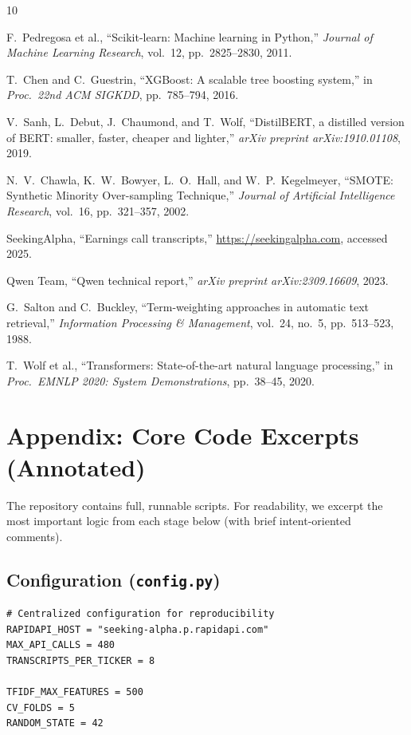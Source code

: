 \documentclass[12pt]{article}
\begin{document}
\begin{thebibliography}{10}

F.~Pedregosa et al.,
``Scikit-learn: Machine learning in Python,''
\emph{Journal of Machine Learning Research}, vol.~12, pp.~2825--2830, 2011.

T.~Chen and C.~Guestrin,
``XGBoost: A scalable tree boosting system,''
in \emph{Proc.\ 22nd ACM SIGKDD}, pp.~785--794, 2016.

V.~Sanh, L.~Debut, J.~Chaumond, and T.~Wolf,
``DistilBERT, a distilled version of BERT: smaller, faster, cheaper and lighter,''
\emph{arXiv preprint arXiv:1910.01108}, 2019.

N.~V.~Chawla, K.~W.~Bowyer, L.~O.~Hall, and W.~P.~Kegelmeyer,
``SMOTE: Synthetic Minority Over-sampling Technique,''
\emph{Journal of Artificial Intelligence Research}, vol.~16, pp.~321--357, 2002.

SeekingAlpha,
``Earnings call transcripts,''
\url{https://seekingalpha.com}, accessed 2025.

Qwen Team,
``Qwen technical report,''
\emph{arXiv preprint arXiv:2309.16609}, 2023.

G.~Salton and C.~Buckley,
``Term-weighting approaches in automatic text retrieval,''
\emph{Information Processing \& Management}, vol.~24, no.~5, pp.~513--523, 1988.

T.~Wolf et al.,
``Transformers: State-of-the-art natural language processing,''
in \emph{Proc.\ EMNLP 2020: System Demonstrations}, pp.~38--45, 2020.

\end{thebibliography}

\clearpage
\appendix
\section*{Appendix: Core Code Excerpts (Annotated)}

\noindent The repository contains full, runnable scripts. For readability, we
excerpt the most important logic from each stage below (with brief
intent-oriented comments).

\subsection*{Configuration (\texttt{config.py})}
\begin{lstlisting}[caption={Core configuration knobs (API limits, CV, features).}]
# Centralized configuration for reproducibility
RAPIDAPI_HOST = "seeking-alpha.p.rapidapi.com"
MAX_API_CALLS = 480
TRANSCRIPTS_PER_TICKER = 8

TFIDF_MAX_FEATURES = 500
CV_FOLDS = 5
RANDOM_STATE = 42
\end{lstlisting}
\end{document}
